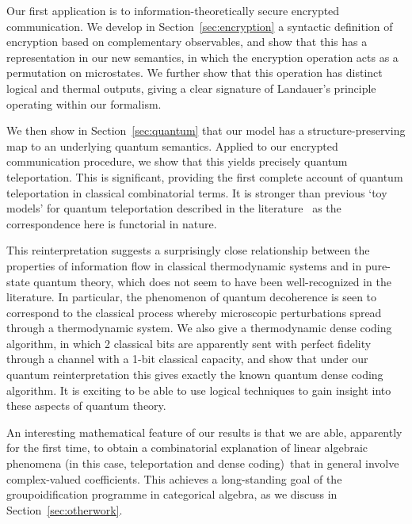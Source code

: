 \documentclass[a4paper,12pt]{article}
\theoremstyle{definition}
\renewcommand{\-}[0]{\nobreakdash-\hspace{0pt}}
\begin{document}
Our first application is to information-theoretically secure encrypted communication. We develop in Section~\ref{sec:encryption} a syntactic definition of encryption based on complementary observables, and show that this has a representation in our new semantics, in which the encryption operation acts as a permutation on microstates. We further show that this operation has distinct logical and thermal outputs, giving a clear signature of Landauer's principle operating within our formalism.

We then show in Section~\ref{sec:quantum} that our model has a structure-preserving map to an underlying quantum semantics. Applied to our encrypted communication procedure, we show that this yields precisely quantum teleportation. This is significant, providing the first complete account of quantum teleportation in classical combinatorial terms. It  is stronger than previous `toy models' for quantum teleportation described in the literature~\cite{ce08-tqc, cp01-cae, osw05-can, s04-dev, sv13-bsnc} as the correspondence here is functorial in nature.

This reinterpretation suggests a surprisingly close relationship between the properties of information flow in classical thermodynamic systems and in pure-state quantum theory, which does not seem to have been well-recognized in the literature. In particular, the phenomenon of quantum decoherence is seen to correspond to the classical process whereby microscopic perturbations spread through a thermodynamic system. We also give a thermodynamic dense coding algorithm, in which 2 classical bits are apparently sent with perfect fidelity through a channel with a 1-bit classical capacity, and show that under our quantum reinterpretation this gives exactly the known quantum dense coding algorithm. It is exciting to be able to use logical techniques to gain insight into these aspects of quantum theory.

An interesting mathematical feature of our results is that we are able, apparently for the first time, to obtain a combinatorial explanation of linear algebraic phenomena (in this case, teleportation and dense coding)\ that in general involve complex-valued coefficients. This achieves a long-standing goal of the groupoidification programme in categorical algebra, as we discuss in Section~\ref{sec:otherwork}.

\end{document}
